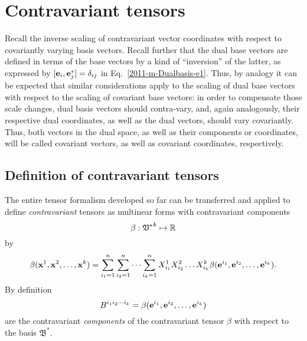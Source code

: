 \section{Contravariant tensors}

Recall the inverse scaling of contravariant vector coordinates with respect to covariantly varying basis vectors.
Recall further that the dual base vectors are defined in terms of the base vectors by
a kind of ``inversion'' of the latter, as expressed by $[{\bf e}_i,  {\bf e}_j^*]=\delta_{ij}$
in Eq.~\ref{2011-m-Dualbasis-e1}.
Thus, by analogy it can be expected that similar considerations apply to
the scaling of dual base vectors with respect to the scaling of covariant base vectors:
in order to compensate those scale changes, dual basis vectors should contra-vary,
and, again analogously,  their respective dual coordinates, as well as the dual vectors,
should vary covariantly.
Thus, both vectors in the dual space, as well as their components or coordinates, will be called covariant vectors,
as well as covariant coordinates, respectively.



\subsection{Definition of contravariant tensors}

The entire tensor formalism developed so far can be transferred and applied to define {\em contravariant} tensors
as multinear forms with contravariant components
\begin{equation}
\beta:{ \frak V^\ast }^k \mapsto {\Bbb R}
\end{equation}
by
\begin{equation}
\beta ( {\bf x}^1,{\bf x}^2,\ldots ,{\bf x}^k)=
\sum_{i_1=1}^n
\sum_{i_2=1}^n
\cdots
\sum_{i_k=1}^n
X_{i_1}^1 X_{i_2}^2 \ldots X_{i_k}^k
\beta ( {\bf e}^{i_1},{\bf e}^{i_2},\ldots ,{\bf e}^{i_k}).
\end{equation}
By definition
\begin{equation}
B^{{i_1}{i_2}\cdots {i_k}}=\beta ( {\bf e}^{i_1},{\bf e}^{i_2},\ldots ,{\bf e}^{i_k})
\label{2011-m-tvtcontrav}
\end{equation}
 are the contravariant
{\em components} of the contravariant tensor $\beta $ with respect to the basis
${\mathfrak B}^\ast$.








